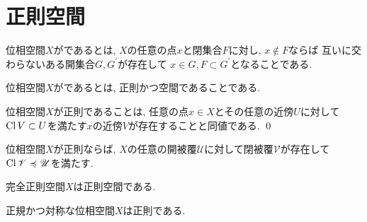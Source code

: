 \documentclass[uplatex, dvipdfmx, a4paper, 12pt, class=jsbook, crop=false]{standalone}
\begin{document}
\section{正則空間}
\label{sec:regular-spaces}

\begin{definition}
	位相空間$ X $がであるとは,
	$ X $の任意の点$ x $と閉集合$ F $に対し,
	$ x \not\in F $ならば
	互いに交わらないある開集合$ G, G^\prime $が存在して
	$ x \in G, F \subset G^\prime $となることである.
\end{definition}

\begin{definition}
	位相空間$ X $がであるとは,
	正則かつ空間であることである.
\end{definition}

\begin{proposition}
	\label{prop:A property equivalent to regularity}
	位相空間$ X $が正則であることは,
	任意の点$ x \in X $とその任意の近傍$ U $に対して
	$ \mathop{\mathrm{Cl}}\nolimits{V} \subset U $を満たす$ x $の近傍$ V $が存在することと同値である.
	\qed
\end{proposition}

\begin{corollary}
	位相空間$ X $が正則ならば,
	$ X $の任意の開被覆$\mathscr{U}$に対して閉被覆$\mathscr{V}$が存在して
	$\mathop{\mathrm{Cl}}\nolimits \mathscr{V} \preccurlyeq \mathscr{U}$を満たす.
\end{corollary}

\begin{proposition}
	完全正則空間$ X $は正則空間である.
\end{proposition}

\begin{proposition}
	正規かつ対称な位相空間$ X $は正則である.
\end{proposition}
\end{document}
